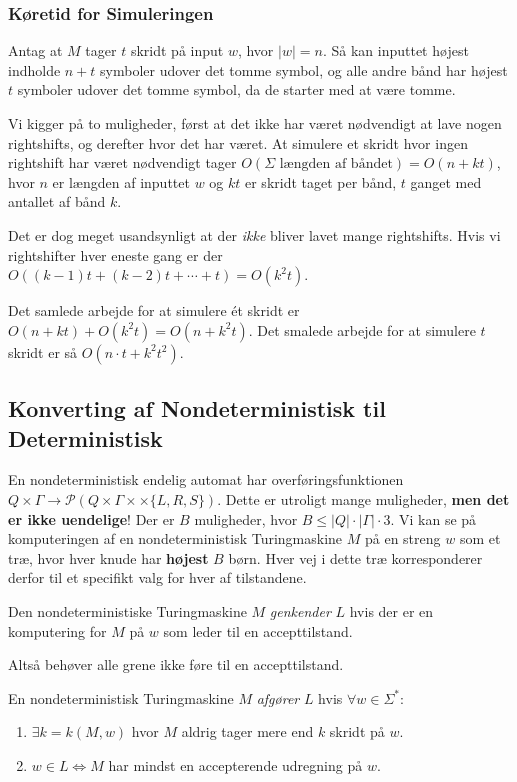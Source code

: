 \subsubsection{Køretid for Simuleringen}

Antag at $M$ tager $t$ skridt på input $w$, hvor $|w| = n$. Så kan inputtet højest indholde $ n  + t$ symboler udover det tomme symbol, og alle andre bånd har højest $t$ symboler udover det tomme symbol, da de starter med at være tomme.

Vi kigger på to muligheder, først at det ikke har været nødvendigt at lave nogen rightshifts, og derefter hvor det har været. At simulere et skridt hvor ingen rightshift har været nødvendigt tager $O(\Sigma \text{ længden af båndet}) = O(n+kt)$, hvor $n$ er længden af inputtet $w$ og $kt$ er skridt taget per bånd, $t$ ganget med antallet af bånd $k$.

Det er dog meget usandsynligt at der \textit{ikke} bliver lavet mange rightshifts. Hvis vi rightshifter hver eneste gang er der $O((k-1)t + (k-2)t + \cdots + t) = O(k^{2}t)$.

Det samlede arbejde for at simulere ét skridt er $O(n+kt) + O(k^{2}t) = O(n+k^{2}t)$. Det smalede arbejde for at simulere $t$ skridt er så $O(n \cdot t + k^{2}t^{2})$.

\subsection{Konverting af Nondeterministisk til Deterministisk}%
\label{subsec:label}

En nondeterministisk endelig automat har overføringsfunktionen $Q \times \Gamma \rightarrow \mathcal{P}(Q \times \Gamma \times \times \{L,R,S\})$. Dette er utroligt mange muligheder, \textbf{men det er ikke uendelige}! Der er $B$ muligheder, hvor $B \le |Q| \cdot |\Gamma| \cdot 3$. Vi kan se på komputeringen af en nondeterministisk Turingmaskine $M$ på  en streng $w$ som et træ, hvor hver knude har \textbf{højest} $B$ børn. Hver vej i dette træ korresponderer derfor til et specifikt valg for hver af tilstandene.


\begin{definition}
	Den nondeterministiske Turingmaskine $M$ \textit{genkender} $L$ hvis der er en komputering for $M$ på $w$ som leder til en accepttilstand.
\end{definition}
Altså behøver alle grene ikke føre til en accepttilstand.

\begin{definition}
	En nondeterministisk Turingmaskine $M$ \textit{afgører} $L$ hvis $\forall w \in \Sigma^{*}$:
	\begin{enumerate}
		\item \(\exists k = k(M, w)\) hvor $M$ aldrig tager mere end $k$ skridt på $w$.
		\item $w \in L \iff M$ har mindst en accepterende udregning på $w$.
	\end{enumerate}
\end{definition}

